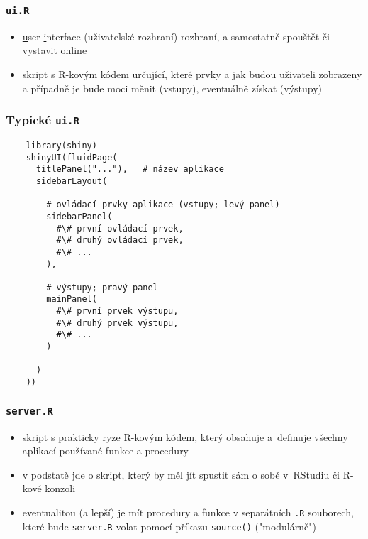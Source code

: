 \documentclass[t]{beamer}
\begin{document}

\begin{frame}
  \frametitle{\texttt{ui.R}}
  \begin{itemize}
    \item \underline{u}ser \underline{i}nterface (uživatelské rozhraní)
    rozhraní, a samostatně spouštět či vystavit online
    \item skript s \textsf{R}-kovým kódem určující, které prvky a jak budou
    uživateli zobrazeny a případně je bude moci měnit (vstupy),
    eventuálně získat (výstupy)
  \end{itemize}
\end{frame}



\begin{frame}[fragile]
  \frametitle{Typické \texttt{ui.R}}
  \begin{lstlisting}
    library(shiny)
    shinyUI(fluidPage(
      titlePanel("..."),   # název aplikace
      sidebarLayout(
    
        # ovládací prvky aplikace (vstupy; levý panel)
        sidebarPanel(
          #\# první ovládací prvek,
          #\# druhý ovládací prvek,
          #\# ...
        ),
    
        # výstupy; pravý panel
        mainPanel(
          #\# první prvek výstupu,
          #\# druhý prvek výstupu,
          #\# ...
        )
    
      )
    ))
  \end{lstlisting}
\end{frame}



\begin{frame}
  \frametitle{\texttt{server.R}}
  \begin{itemize}
    \item skript s prakticky ryze \textsf{R}-kovým kódem, který obsahuje
    a~definuje všechny aplikací používané funkce a procedury
    \item v podstatě jde o skript, který by měl jít spustit sám o sobě
    v~RStudiu či \textsf{R}-kové konzoli
    \item eventualitou (a lepší) je mít procedury a funkce v separátních
    \texttt{.R} souborech, které bude \texttt{server.R} volat pomocí
    příkazu \texttt{source()} ("modulárně")
  \end{itemize}
\end{frame}
\end{document}
